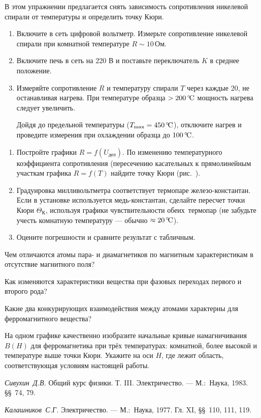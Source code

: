 \begin{lab:task}

В этом упражнении предлагается снять зависимость сопротивления никелевой
спирали от температуры и определить точку Кюри.

\begin{enumerate}
\item
  Включите в сеть цифровой вольтметр. Измерьте сопротивление никелевой спирали
при комнатной температуре $R \sim 10\,\text{Ом}$.
\item
  Включите печь в сеть на 220 В и поставьте переключатель $K$ в среднее
положение.
\item
  Измеряйте сопротивление $R$ и температуру спирали $T$ через каждые 20\oC,
  не останавливая нагрева. При температуре образца $>200\,^\circ\!\mathrm{C}$ мощность
нагрева следует увеличить.

Дойдя до предельной температуры ($T_\text{max} = 450\,^\circ\!\mathrm{C}$), отключите
нагрев и проведите измерения при охлаждении образца до $100\,^\circ\!\mathrm{C}$.
\end{enumerate}

\begin{enumerate}
\item
  Постройте графики $R = f(U_\text{дел})$. По изменению температурного
коэффициента сопротивления (пересечению касательных к прямолинейным участкам
графика $R = f(T)$ найдите точку Кюри (рис.~).
\item
  Градуировка милливольтметра соответствует термопаре железо-кон\-стантан. Если
в установке используется медь-константан, сделайте пересчет точки Кюри
$\Theta_{К}$, используя графики чувствительности \mbox{обеих тер}\-мопар (не
забудьте учесть комнатную температуру --- обычно $\approx20\,^\circ\!\mathrm{C}$).
\item
  Оцените погрешности и сравните результат с табличным.
\end{enumerate}
\end{lab:task}

\begin{lab:questions}

\item
  Чем отличаются атомы пара- и диамагнетиков по магнитным характеристикам в
отсутствие магнитного поля?
\item
  Как изменяются характеристики вещества при фазовых переходах первого и
второго рода?
\item
  Какие два конкурирующих взаимодействия между атомами характерны для
ферромагнитного вещества?
\item
  На одном графике качественно изобразите начальные кривые намагничивания
$B(H)$ для ферромагнетика при трёх температурах: комнатной, более высокой и
температуре выше точки Кюри. Укажите на оси $H$, где лежит область,
соответствующая условиям настоящей работы.

\end{lab:questions}

\begin{lab:literature}

\item
  \emph{Сивухин~Д.В.} Общий курс физики. Т. III. Электричество. --- М.:~Наука,
1983. \S\S~74, 79.
\item
  \emph{Калашников~С.Г.} Электричество. --- М.:~Наука, 1977. Гл. XI, \S\S~110,
111, 119.
\end{lab:literature}

